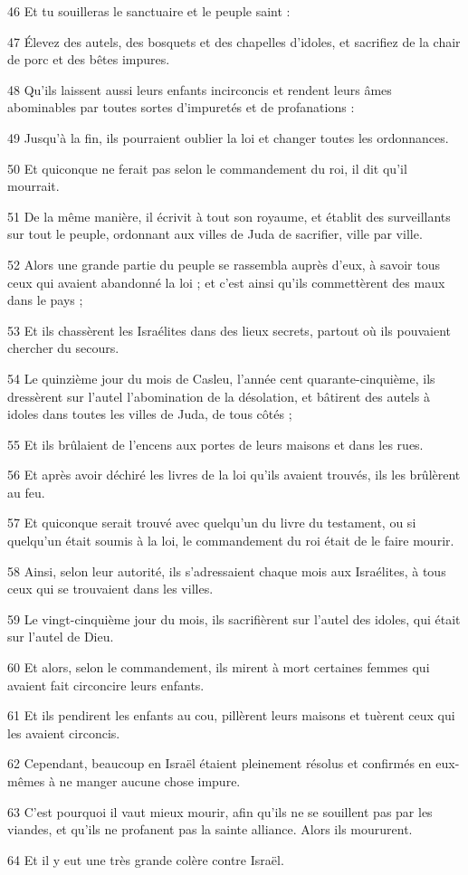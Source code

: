 \par 46 Et tu souilleras le sanctuaire et le peuple saint :
\par 47 Élevez des autels, des bosquets et des chapelles d'idoles, et sacrifiez de la chair de porc et des bêtes impures.
\par 48 Qu'ils laissent aussi leurs enfants incirconcis et rendent leurs âmes abominables par toutes sortes d'impuretés et de profanations :
\par 49 Jusqu'à la fin, ils pourraient oublier la loi et changer toutes les ordonnances.
\par 50 Et quiconque ne ferait pas selon le commandement du roi, il dit qu'il mourrait.
\par 51 De la même manière, il écrivit à tout son royaume, et établit des surveillants sur tout le peuple, ordonnant aux villes de Juda de sacrifier, ville par ville.
\par 52 Alors une grande partie du peuple se rassembla auprès d'eux, à savoir tous ceux qui avaient abandonné la loi ; et c'est ainsi qu'ils commettèrent des maux dans le pays ;
\par 53 Et ils chassèrent les Israélites dans des lieux secrets, partout où ils pouvaient chercher du secours.
\par 54 Le quinzième jour du mois de Casleu, l'année cent quarante-cinquième, ils dressèrent sur l'autel l'abomination de la désolation, et bâtirent des autels à idoles dans toutes les villes de Juda, de tous côtés ;
\par 55 Et ils brûlaient de l'encens aux portes de leurs maisons et dans les rues.
\par 56 Et après avoir déchiré les livres de la loi qu'ils avaient trouvés, ils les brûlèrent au feu.
\par 57 Et quiconque serait trouvé avec quelqu'un du livre du testament, ou si quelqu'un était soumis à la loi, le commandement du roi était de le faire mourir.
\par 58 Ainsi, selon leur autorité, ils s'adressaient chaque mois aux Israélites, à tous ceux qui se trouvaient dans les villes.
\par 59 Le vingt-cinquième jour du mois, ils sacrifièrent sur l'autel des idoles, qui était sur l'autel de Dieu.
\par 60 Et alors, selon le commandement, ils mirent à mort certaines femmes qui avaient fait circoncire leurs enfants.
\par 61 Et ils pendirent les enfants au cou, pillèrent leurs maisons et tuèrent ceux qui les avaient circoncis.
\par 62 Cependant, beaucoup en Israël étaient pleinement résolus et confirmés en eux-mêmes à ne manger aucune chose impure.
\par 63 C'est pourquoi il vaut mieux mourir, afin qu'ils ne se souillent pas par les viandes, et qu'ils ne profanent pas la sainte alliance. Alors ils moururent.
\par 64 Et il y eut une très grande colère contre Israël.

